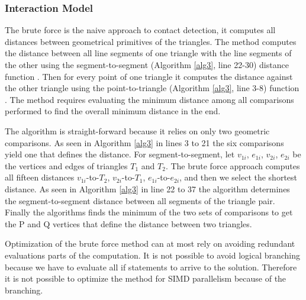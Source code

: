 \documentclass[times,12pt]{article}
\begin{document}
\subsubsection{Interaction Model}

The brute force is the naive approach to contact detection, it computes all distances between geometrical primitives of the triangles. The method computes the distance between all line segments of one triangle with the line segments of the other using the segment-to-segment (Algorithm \ref{alg3}, line 22-30) distance function \cite{Ericson2005, Tropp2006}. Then for every point of one triangle it computes the distance against the other triangle using the point-to-triangle (Algorithm \ref{alg3}, line 3-8) function \cite{Eberly1999, Ericson2005}. The method requires evaluating the minimum distance among all comparisons performed to find the overall minimum distance in the end.

The algorithm is straight-forward because it relies on only two geometric comparisons. As seen in Algorithm \ref{alg3} in lines 3 to 21 the six comparisons yield one that defines the distance. For segment-to-segment, let $v_{1i}$, $e_{1i}$, $v_{2i}$, $e_{2i}$ be the vertices and edges of triangles $T_1$ and $T_2$. The brute force approach computes all fifteen distances $v_{1i}$-to-$T_2$, $v_{2i}$-to-$T_1$, $e_{1i}$-to-$e_{2i}$, and then we select the shortest distance. As seen in Algorithm \ref{alg3} in line 22 to 37 the algorithm determines the segment-to-segment distance between all segments of the triangle pair. Finally the algorithms finds the minimum of the two sets of comparisons to get the P and Q vertices that define the distance between two triangles. 

Optimization of the brute force method can at most rely on avoiding redundant evaluations parts of the computation. It is not possible to avoid logical branching because we have to evaluate all if statements to arrive to the solution. Therefore it is not possible to optimize the method for SIMD parallelism because of the branching. 
\end{document}
